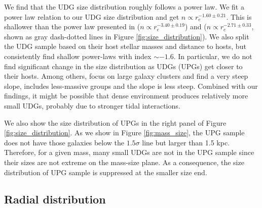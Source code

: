 \documentclass[twocolumn,astrosymb,twocolappendix]{aastex631}
\begin{document}
\begin{CJK*}{UTF8}{gbsn}
We find that the UDG size distribution roughly follows a power law. We fit a power law relation to our UDG size distribution and get $n\propto r_e^{-1.60\pm0.21}$. This is shallower than the power law presented in \citet{vdBurg2016} ($n\propto r_e^{-3.40\pm0.19}$) and \citet{vdBurg2017} ($n\propto r_e^{-2.71\pm0.33}$, shown as gray dash-dotted lines in Figure \ref{fig:size_distribution}). We also split the UDG sample based on their host stellar masses and distance to hosts, but consistently find shallow power-laws with index $\sim -1.6$. In particular, we do not find significant change in the size distribution as UDGs (UPGs) get closer to their hosts. Among others, \citet{vdBurg2016} focus on large galaxy clusters and find a very steep slope, \citet{vdBurg2017} includes less-massive groups and the slope is less steep. Combined with our findings, it might be possible that dense environment produces relatively more small UDGs, probably due to stronger tidal interactions. 

We also show the size distribution of UPGs in the right panel of Figure \ref{fig:size_distribution}. As we show in Figure \ref{fig:mass_size}, the UPG sample does not have those galaxies below the $1.5\sigma$ line but larger than 1.5 kpc. Therefore, for a given mass, many small UDGs are not in the UPG sample since their sizes are not extreme on the mass-size plane. As a consequence, the size distribution of UPG sample is suppressed at the smaller size end. 

\subsection{Radial distribution}\label{sec:radial_distr}


\end{CJK*}
\end{document}
